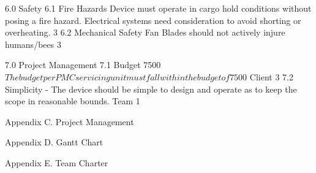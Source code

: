 6.0	Safety	 	 	 	 
6.1	Fire Hazards		Device must operate in cargo hold conditions without posing a fire hazard. Electrical systems need consideration to avoid shorting or overheating.		3
6.2	Mechanical Safety		Fan Blades should not actively injure humans/bees		3
					
7.0	Project Management	 	 	 	 
7.1	Budget	7500$	The budget per PMC servicing unit must fall within the budget of 7500$	Client	3
7.2	Simplicity	-	The device should be simple to design and operate as to keep the scope in reasonable bounds.	Team	1

Appendix C.	Project Management

Appendix D.	Gantt Chart

Appendix E.	Team Charter


